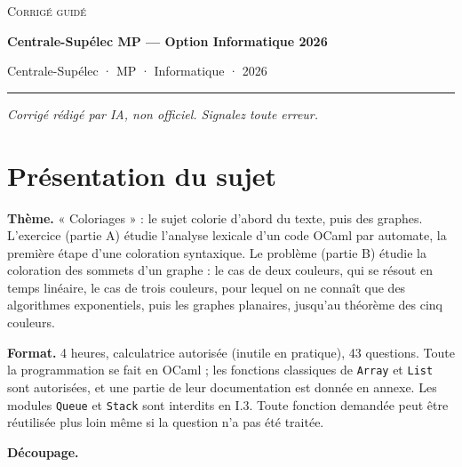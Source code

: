 \documentclass[11pt,a4paper]{article}
\begin{document}
\thispagestyle{plain}
\begin{center}
  {\small\scshape Corrigé guidé}\par\smallskip
  {\LARGE\bfseries Centrale-Supélec MP — Option Informatique 2026\par}\medskip
  {\large Centrale-Supélec · MP · Informatique · 2026\par}
\end{center}
\vspace{2pt}\hrule\vspace{8pt}

\emph{Corrigé rédigé par IA, non officiel. Signalez toute erreur.}

\hypertarget{pruxe9sentation-du-sujet}{%
\section{Présentation du sujet}\label{pruxe9sentation-du-sujet}}

\textbf{Thème.} « Coloriages » : le sujet colorie d'abord du texte, puis des graphes. L'exercice (partie A) étudie l'analyse lexicale d'un code OCaml par automate, la première étape d'une coloration syntaxique. Le problème (partie B) étudie la coloration des sommets d'un graphe : le cas de deux couleurs, qui se résout en temps linéaire, le cas de trois couleurs, pour lequel on ne connaît que des algorithmes exponentiels, puis les graphes planaires, jusqu'au théorème des cinq couleurs.

\textbf{Format.} 4 heures, calculatrice autorisée (inutile en pratique), 43 questions. Toute la programmation se fait en OCaml ; les fonctions classiques de \texttt{Array} et \texttt{List} sont autorisées, et une partie de leur documentation est donnée en annexe. Les modules \texttt{Queue} et \texttt{Stack} sont interdits en I.3. Toute fonction demandée peut être réutilisée plus loin même si la question n'a pas été traitée.

\textbf{Découpage.}
\end{document}
